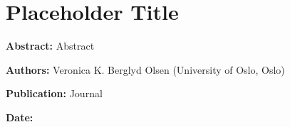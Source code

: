 %
%

\chapter{Placeholder Title}
\label{Pub:PRev17}

\begin{hangparas}{10mm}{1}

    \textbf{Abstract:}
    Abstract

    \vspace{8mm}

    \textbf{Authors:}
    Veronica K. Berglyd Olsen (University of Oslo, Oslo)

    \vspace{5mm}

    \textbf{Publication:}
    Journal

    \vspace{5mm}

    \textbf{Date:}

\end{hangparas}

